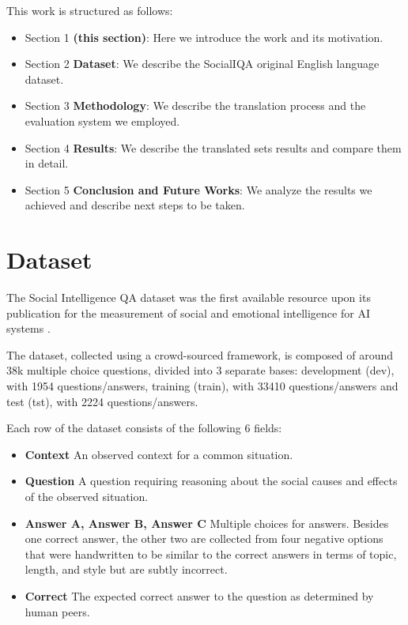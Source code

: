\documentclass{article}
\begin{document}
This work is structured as follows:
\begin{itemize}
    \item Section 1 \textbf{(this section)}: Here we introduce the work and its
    motivation.
    \item Section 2 \textbf{Dataset}: We describe the SocialIQA original English
    language dataset.
    \item Section 3 \textbf{Methodology}: We describe the translation process
    and the evaluation system we employed.
    \item Section 4 \textbf{Results}: We describe the translated sets results
    and compare them in detail.
    \item Section 5 \textbf{Conclusion and Future Works}: We analyze the results
    we achieved and describe next steps to be taken.
\end{itemize}

\section{Dataset}
The Social Intelligence QA dataset was the first available resource upon its
publication for the measurement of social and emotional intelligence for AI
systems \cite{socialiqa}.

The dataset, collected using a crowd-sourced
framework, is composed of around 38k multiple choice questions, divided into 3
separate bases: development (dev), with 1954 questions/answers, training
(train), with 33410 questions/answers and test (tst), with 2224
questions/answers.

Each row of the dataset consists of the following 6 fields:

\begin{itemize}
    \item \textbf{Context} An observed context for a common situation.
    \item \textbf{Question} A question requiring reasoning about the social
    causes and effects of the observed situation.
    \item \textbf{Answer A, Answer B, Answer C} Multiple choices for answers.
    Besides one correct answer, the other two are collected from four negative
    options that were handwritten to be similar to the correct answers in terms
    of topic, length, and style but are subtly incorrect.
    \item \textbf{Correct} The expected correct answer to the question as
    determined by human peers.
\end{itemize}
\end{document}

